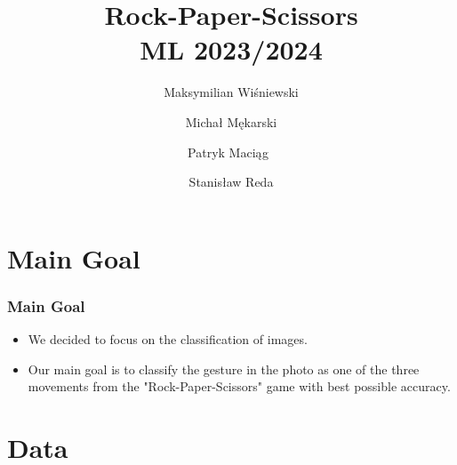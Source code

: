 \documentclass{beamer}
\title{ \large{Rock-Paper-Scissors} \\
        \small{ML 2023/2024}}
\author{
    Maksymilian Wiśniewski \and
    Michał Mękarski \\ \and
    Patryk Maciąg  \and
    Stanisław Reda
}
\date{}
\begin{document}
\maketitle

\section{Main Goal}

\begin{frame}
    \frametitle{Main Goal}
    \begin{itemize}
        \item We decided to focus on the classification of images.

        \item Our main goal is to classify the gesture in the photo as one of the three movements from the "Rock-Paper-Scissors" game with best possible accuracy.
    \end{itemize}
\end{frame}

\section{Data}
\end{document}
